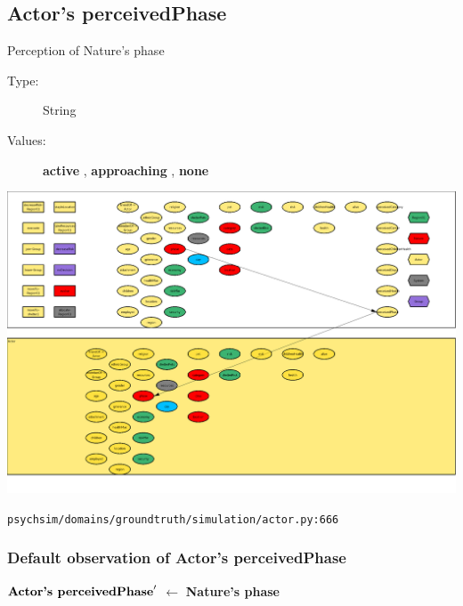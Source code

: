 \documentclass{article}%
\begin{document}
\subsection{Actor's perceivedPhase}%
\label{subsec:Actor's perceivedPhase}%
Perception of Nature's phase%
\begin{description}%
\item[Type:]%
String%
\item[Values:]%
\textbf{active}%
, %
\textbf{approaching}%
, %
\textbf{none}%
\end{description}%
\includegraphics[width=\textwidth]{images/perceivedPhaseOfActor.png}%
\begin{flushleft}%
\verb|psychsim/domains/groundtruth/simulation/actor.py:666|%
\end{flushleft}%
\subsubsection{Default observation of Actor's perceivedPhase}%
\label{ssubsec:Default observation of Actor's perceivedPhase}%
\begin{flushleft}%
$\mbox{\textbf{Actor's perceivedPhase}} '$%
$\leftarrow$%
\textbf{Nature's phase}%
\end{flushleft}

%
\end{document}
